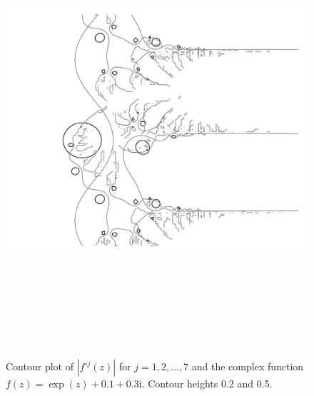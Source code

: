 \documentclass[12pt, a4paper]{amsart}
\newcommand{\mi}{\text{i}}  %
\begin{document}
\begin{figure}[!ht] 
\includegraphics[height=160mm, angle=-90]{images/landscape.pdf}\\[10mm]
\caption{
Contour plot of $|f^{\circ j}(z)|$ for $j=1, 2, \ldots, 7$ and the complex function $f(z) = \exp(z) + 0.1 + 0.3\mi$.
Contour heights 0.2 and 0.5.
}
\end{figure}
\pagebreak
\end{document}
